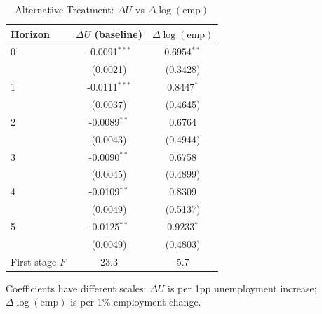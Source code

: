 \begin{table}[htbp]
\centering
\caption{Alternative Treatment: $\Delta U$ vs $\Delta \log(\text{emp})$}
\label{tab:empgrowth}
\begin{tabular}{lcc}
\hline\hline
Horizon & $\Delta U$ (baseline) & $\Delta \log(\text{emp})$ \\
\hline
0 & -0.0091$^{***}$ & 0.6954$^{**}$ \\
 & (0.0021) & (0.3428) \\[3pt]
1 & -0.0111$^{***}$ & 0.8447$^{*}$ \\
 & (0.0037) & (0.4645) \\[3pt]
2 & -0.0089$^{**}$ & 0.6764 \\
 & (0.0043) & (0.4944) \\[3pt]
3 & -0.0090$^{**}$ & 0.6758 \\
 & (0.0045) & (0.4899) \\[3pt]
4 & -0.0109$^{**}$ & 0.8309 \\
 & (0.0049) & (0.5137) \\[3pt]
5 & -0.0125$^{**}$ & 0.9233$^{*}$ \\
 & (0.0049) & (0.4803) \\[3pt]
\hline
First-stage $F$ & 23.3 & 5.7 \\
\hline\hline
\end{tabular}
\begin{tablenotes}\small
\item Coefficients have different scales: $\Delta U$ is per 1pp unemployment increase;
$\Delta \log(\text{emp})$ is per 1\% employment change.
\end{tablenotes}
\end{table}